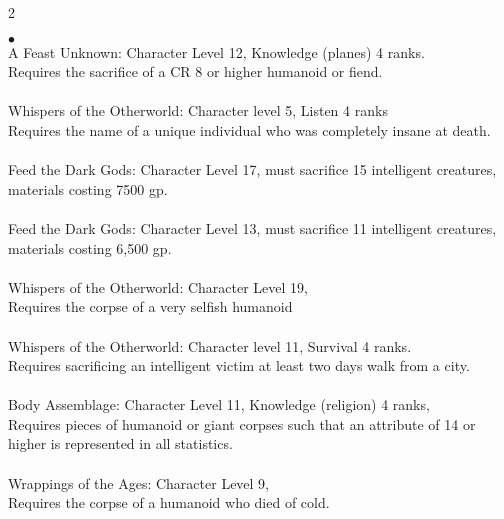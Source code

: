 \begin{multicols}{2}
\begin{small}
\begin{list}{$\bullet$}{\itemspace}
\\
A Feast Unknown: Character Level 12, Knowledge (planes) 4 ranks.\\
Requires the sacrifice of a CR 8 or higher humanoid or fiend.\\
\\
Whispers of the Otherworld: Character level 5, Listen 4 ranks\\
Requires the name of a unique individual who was completely insane at death.\\
\\
Feed the Dark Gods: Character Level 17, must sacrifice 15 intelligent creatures, materials costing 7500 gp.\\
\\
Feed the Dark Gods: Character Level 13, must sacrifice 11 intelligent creatures, materials costing 6,500 gp.\\
\\
Whispers of the Otherworld: Character Level 19, \\
Requires the corpse of a very selfish humanoid\\
\\
Whispers of the Otherworld: Character level 11, Survival 4 ranks.\\
Requires sacrificing an intelligent victim at least two days walk from a city.\\
\\
Body Assemblage: Character Level 11, Knowledge (religion) 4 ranks, \\
Requires pieces of humanoid or giant corpses such that an attribute of 14 or higher is represented in all statistics.\\
\\
Wrappings of the Ages: Character Level 9, \\
Requires the corpse of a humanoid who died of cold.\\
\\

\end{list}
\end{small}
\end{multicols}
